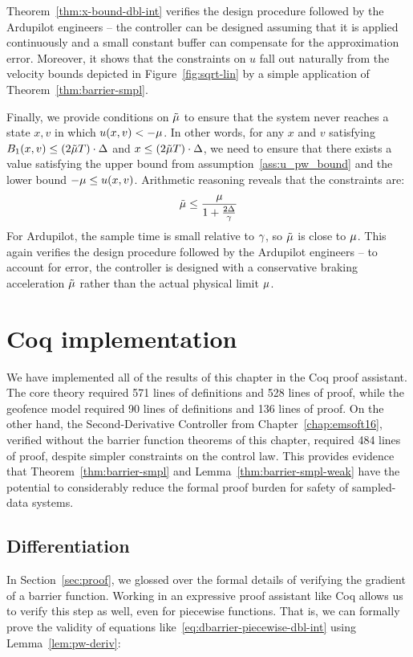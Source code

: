Theorem~\ref{thm:x-bound-dbl-int} verifies the design procedure followed by
the Ardupilot engineers -- the controller can be designed assuming that it
is applied continuously and a small constant buffer can compensate for the
approximation error. Moreover, it shows that the constraints on $u$ fall
out naturally from the velocity bounds depicted in
Figure~\ref{fig:sqrt-lin} by a simple application of
Theorem~\ref{thm:barrier-smpl}.

Finally, we provide conditions on $\tilde{\mu}$ to ensure that the system never
reaches a state $x,v$ in which $u(x,v) < -\mu$. In other words, for any
$x$ and $v$ satisfying $B_1 (x,v) \leq (2\tilde{\mu} T) \cdot \Delta$ and $x \leq
(2\tilde{\mu} T) \cdot \Delta$, we need to ensure that there exists a value
satisfying the upper bound from assumption~\ref{ass:u_pw_bound} and the
lower bound $-\mu \leq u(x,v)$. Arithmetic reasoning reveals that the
constraints are:
\begin{equation}
\tilde{\mu} \leq \frac{\mu}{1 + \frac{2\Delta}{\gamma}}
\end{equation}
For Ardupilot, the sample time is small relative to $\gamma$, so $\tilde{\mu}$ is
close to $\mu$. This again verifies the design procedure followed by the
Ardupilot engineers -- to account for error, the controller is designed
with a conservative braking acceleration $\tilde{\mu}$ rather than the actual
physical limit $\mu$.

\section{Coq implementation}
\label{sec:coq}
We have implemented all of the results of this chapter in the Coq proof
assistant. The core theory required 571 lines of definitions and 528 lines
of proof, while the geofence model required 90 lines of definitions and 136
lines of proof. On the other hand, the Second-Derivative Controller from
Chapter~\ref{chap:emsoft16}, verified without the barrier function theorems
of this chapter, required 484 lines of proof, despite simpler constraints
on the control law. This provides evidence that
Theorem~\ref{thm:barrier-smpl} and Lemma~\ref{thm:barrier-smpl-weak} have
the potential to considerably reduce the formal proof burden for safety of
sampled-data systems.

\subsection{Differentiation}
\label{sec:differentiation}
In Section~\ref{sec:proof}, we glossed over the formal details of verifying
the gradient of a barrier function. Working in an expressive proof
assistant like Coq allows us to verify this step as well, even for
piecewise functions. That is, we can formally prove the validity of
equations like~\eqref{eq:dbarrier-piecewise-dbl-int} using
Lemma~\ref{lem:pw-deriv}:

